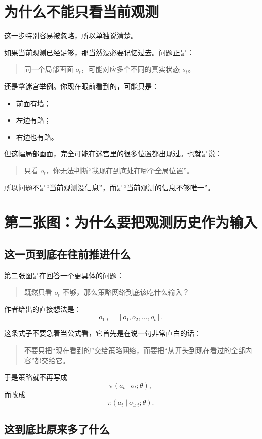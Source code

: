 \documentclass[12pt,a4paper]{ctexart}
\begin{document}
\section{为什么不能只看当前观测}

这一步特别容易被忽略，所以单独说清楚。

如果当前观测已经足够，那当然没必要记忆过去。问题正是：
\begin{quote}
同一个局部画面 \(o_t\)，可能对应多个不同的真实状态 \(s_t\)。
\end{quote}

还是拿迷宫举例。你现在眼前看到的，可能只是：
\begin{itemize}
  \item 前面有墙；
  \item 左边有路；
  \item 右边也有路。
\end{itemize}

但这幅局部画面，完全可能在迷宫里的很多位置都出现过。也就是说：
\begin{quote}
只看 \(o_t\)，你无法判断“我现在到底处在哪个全局位置”。
\end{quote}

所以问题不是“当前观测没信息”，而是“当前观测的信息不够唯一”。

\section{第二张图：为什么要把观测历史作为输入}

\subsection{这一页到底在往前推进什么}

第二张图是在回答一个更具体的问题：
\begin{quote}
既然只看 \(o_t\) 不够，那么策略网络到底该吃什么输入？
\end{quote}

作者给出的直接想法是：
\[
o_{1:t} = [o_1, o_2, \ldots, o_t].
\]

这条式子不要急着当公式看，它首先是在说一句非常直白的话：
\begin{quote}
不要只把“现在看到的”交给策略网络，而要把“从开头到现在看过的全部内容”都交给它。
\end{quote}

于是策略就不再写成
\[
\pi(a_t \mid o_t; \theta),
\]
而改成
\[
\pi(a_t \mid o_{1:t}; \theta).
\]


\subsection{这到底比原来多了什么}
\end{document}
